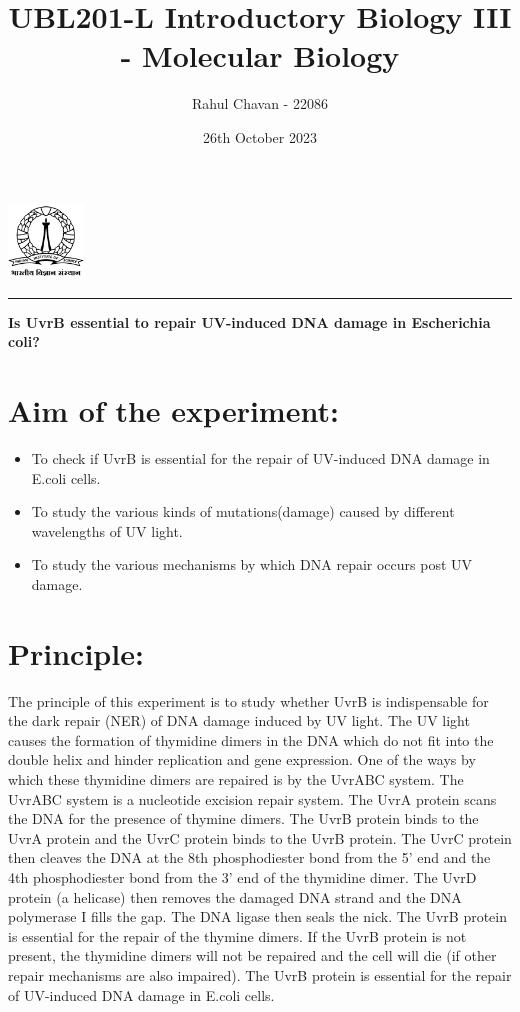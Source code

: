 \documentclass{report}
\title{\textbf{UBL201-L Introductory Biology III - Molecular Biology}}
\author{Rahul Chavan - 22086}
\date{26th October 2023}
\renewcommand{\maketitle}{
 \begin{center}
    \includegraphics[width=2cm]{IISc_Master_Seal_Black.jpg}
    \vspace{0.5cm}

    \Large
    \textbf{\thetitle}
    
    \vspace{0.5cm}
    
    \Large
    \theauthor
    
    \vspace{0.2cm}
    
    \large
    \thedate

    \vspace{0.5cm}

    \hrule  
    
  \end{center}
}
\begin{document}
\maketitle
\begin{center}
    \Large
    \textbf{Is UvrB essential to repair UV-induced DNA damage in Escherichia coli?}
\end{center} 


\section*{Aim of the experiment:}
\begin{itemize}
  \item To check if UvrB is essential for the repair of UV-induced DNA damage in E.coli cells.
  \item To study the various kinds of mutations(damage) caused by different wavelengths of UV light. 
  \item To study the various mechanisms by which DNA repair occurs post UV damage.
\end{itemize}

\section*{Principle:}
The principle of this experiment is to study whether UvrB is indispensable for the dark repair (NER) of DNA
damage induced by UV light.
The UV light causes the formation of thymidine dimers in the DNA which do not fit into the double helix and hinder replication and gene expression. 
One of the ways by which these thymidine dimers are repaired is by the UvrABC system. 
The UvrABC system is a nucleotide excision repair system. The UvrA protein scans the DNA for the presence of thymine dimers. 
The UvrB protein binds to the UvrA protein and the UvrC protein binds to the UvrB protein. The UvrC protein then cleaves 
the DNA at the 8th phosphodiester bond from the 5' end and the 4th phosphodiester bond from the 3' end of the thymidine dimer. 
The UvrD protein (a helicase) then removes the damaged DNA strand and the DNA polymerase I fills the gap. The DNA ligase then seals the nick. 
The UvrB protein is essential for the repair of the thymine dimers. If the UvrB protein is not present, the thymidine dimers 
will not be repaired and the cell will die (if other repair mechanisms are also impaired). 
The UvrB protein is essential for the repair of UV-induced DNA damage in E.coli cells.
\end{document}
